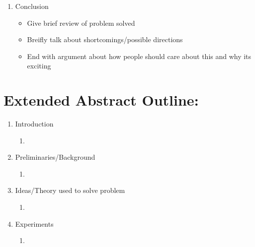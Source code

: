 \begin{enumerate}
        \item Conclusion
            \begin{itemize}
            \item Give brief review of problem solved
            \item Breifly talk about shortcomings/possible directions
            \item End with argument about how people should care about this and why its exciting
            \end{itemize}
        \end{enumerate}
    \fi

    
    \section{Extended Abstract Outline:}
    \begin{enumerate}
        \item Introduction
        \begin{enumerate}
            \item 
        \end{enumerate}
        
        \item Preliminaries/Background
        \begin{enumerate}
            \item 
        \end{enumerate}
        
        
        \item Ideas/Theory used to solve problem
        \begin{enumerate}
            \item 
        \end{enumerate}
        
        \item Experiments
        \begin{enumerate}
            \item 
        \end{enumerate}
        

\end{enumerate}
